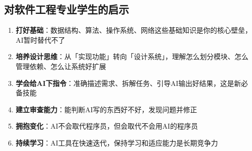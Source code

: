 \documentclass[12pt,a4paper]{article}
\begin{document}
\subsection{对软件工程专业学生的启示}

\begin{enumerate}[leftmargin=2em]
    \item \textbf{打好基础}：数据结构、算法、操作系统、网络这些基础知识是你的核心壁垒，AI暂时替代不了
    \item \textbf{培养设计思维}：从「实现功能」转向「设计系统」，理解怎么划分模块、怎么管理依赖、怎么让系统好扩展
    \item \textbf{学会给AI下指令}：准确描述需求、拆解任务、引导AI输出好结果，这是新必备技能
    \item \textbf{建立审查能力}：能判断AI写的东西好不好，发现问题并修正
    \item \textbf{拥抱变化}：AI不会取代程序员，但会取代不会用AI的程序员
    \item \textbf{持续学习}：AI工具在快速迭代，保持学习和适应能力是长期竞争力
\end{enumerate}
\end{document}
